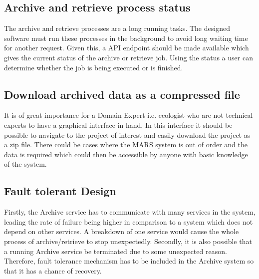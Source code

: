         \subsection{Archive and retrieve process status}  
            The archive and retrieve processes are a long running tasks. The designed software must run these processes in the background to avoid 
            long waiting time for another request. Given this, a API endpoint should be made available which gives the current status of the archive 
            or retrieve job. Using the status a user can determine whether the job is being executed or is finished.


        \subsection{Download archived data as a compressed file}
            It is of great importance for a Domain Expert i.e. ecologist who are not technical experts to have a graphical interface in hand. In this interface
            it should be possible to navigate to the project of interest and easily download the project as a zip file. There could be cases where the
            MARS system is out of order and the data is required which could then be accessible by anyone with basic knowledge of the system.
        
        \subsection{Fault tolerant Design}   
        Firstly, the Archive service has to communicate with many services in the system, leading the rate of failure being higher
        in comparison to a system which does not depend on other services. A breakdown 
        of one service would cause the whole process of archive/retrieve to stop unexpectedly.  Secondly, it is also possible that a running Archive service be terminated
        due to some unexpected reason. Therefore, fault tolerance mechanism has to be included in the Archive system so that it has a chance of 
        recovery. 
